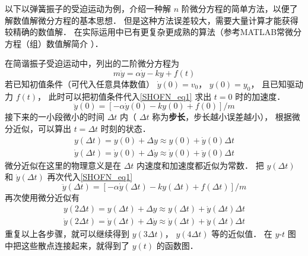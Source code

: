 

以下以弹簧振子的受迫运动为例，介绍一种解 $n$ 阶微分方程的简单方法，以便了解数值解微分方程的基本思想． 但是这种方法误差较大，需要大量计算才能获得较精确的数值解． 在实际运用中已有更复杂更成熟的算法（参考MATLAB常微分方程（组）数值解简介%
）．

在简谐振子受迫运动中，列出的二阶微分方程为
\begin{equation}\label{SHOFN_eq1}
m\ddot y = \alpha \dot y - ky + f(t)
\end{equation}
若已知初值条件（可代入任意具体数值） $\dot y(0) = v_0$，  $y(0) = y_0$， 且已知驱动力 $f(t)$， 此时可以把初值条件代入\autoref{SHOFN_eq1} 求出 $t = 0$ 时的加速度．
\begin{equation}
\ddot y(0) = [- \alpha \dot y(0) - ky(0) + f(0)]/m
\end{equation}
接下来的一小段微小的时间 $\Delta t$ 内（ $\Delta t$ 称为\textbf{步长}，步长越小误差越小）， 根据微分近似，可以算出 $t = \Delta t$ 时刻的状态．
\begin{gather}
y(\Delta t) =  y(0) + \Delta y \approx y(0) + \dot y(0) \Delta t\\
\dot y(\Delta t) = \dot y(0) + \Delta \dot y \approx \dot y(0) + \ddot y(0) \Delta t
\end{gather}
微分近似在这里的物理意义是在 $\Delta t$ 内速度和加速度都近似为常数． 把 $y(\Delta t)$ 和 $\dot y(\Delta t)$ 再次代入\autoref{SHOFN_eq1}
\begin{equation}
\ddot y(\Delta t) = [- \alpha \dot y(\Delta t) - ky(\Delta t) + f(\Delta t)]/m
\end{equation}
再次使用微分近似有
\begin{gather}
y(2\Delta t) =  y(\Delta t) + \Delta y \approx y(\Delta t) + \dot y(\Delta t) \Delta t\\
\dot y(2\Delta t) = \dot y(\Delta t) + \Delta \dot y \approx \dot y(\Delta t) + \ddot y(\Delta t) \Delta t
\end{gather}
重复以上各步骤，就可以继续得到 $y(3\Delta t)$，  $y(4\Delta t)$ 等的近似值． 在 $y$-$t$ 图中把这些散点连接起来，就得到了 $y(t)$ 的函数图．

